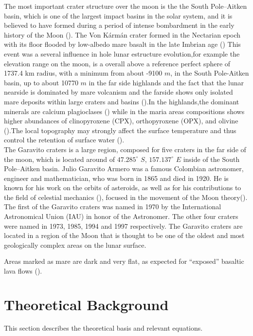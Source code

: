 \documentclass[aps,prd,nofootinbib,superscriptaddress,floatfix,longbibliography,author-year]{revtex4-2}
\begin{document}
The most important crater structure over the moon is the the South Pole–Aitken basin, which is one of the largest impact basins in the solar system, and it is believed to have formed during a period of intense bombardment in the early history of the Moon (\citet{JAUMANN201215}). The Von Kármán crater formed in the Nectarian epoch with its floor flooded by low-albedo mare basalt in the late Imbrian
age (\citet{PASCKERT2018538}) This event was a several influence in hole lunar estructure evolution,for example the elevation range on the moon, is a overall above a reference perfect sphere of 1737.4 km radius, with a minimum from about -9100 $m$, in the South Pole-Aitken basin, up to about 10770 $m$ in the far side highlands and the fact that the lunar nearside is dominated by mare volcanism and the farside shows only isolated mare deposits within large craters and basins (\citet{JAUMANN201215}).In the highlands,the dominant minerals are calcium plagioclases (\citet{TAYLOR1972263}) while in the maria areas compositions shows higher abundances of clinopyroxene (CPX), orthopyroxene (OPX), and olivine (\citet{ALBEE2003825}).The local topography may strongly affect the surface temperature and thus control the retention of surface water (\citet{LI2025116668}).\\

The Garavito craters is a large region, composed for five craters in  the far side of the moon, which is located around of $47.285^\circ$ $S$, $157.137^\circ$ $E$ inside of the South Pole–Aitken basin. Julio Garavito Armero was a famous Colombian astronomer, engineer and mathematician, who was born in 1865 and died in 1920. He is known for his work on the orbits of asteroids, as well as for his contributions to the field of celestial mechanics (\citet{book:Brouwer1961}), focused in the movement of the Moon theory(\citet{Sanchez2025}). The first of the Garavito craters was named in 1970 by the International Astronomical Union (IAU) in honor of the Astronomer. The other four craters were named in 1973, 1985, 1994 and 1997 respectively. The Garavito craters are located in a region of the Moon that is thought to be one of the oldest and most geologically complex areas on the lunar surface.

Areas marked as mare are dark and very flat, as expected for “exposed” basaltic lava flows (\citet{Gibson2011}).
\section{Theoretical Background}
This section describes the theoretical basis and relevant equations.
\end{document}
